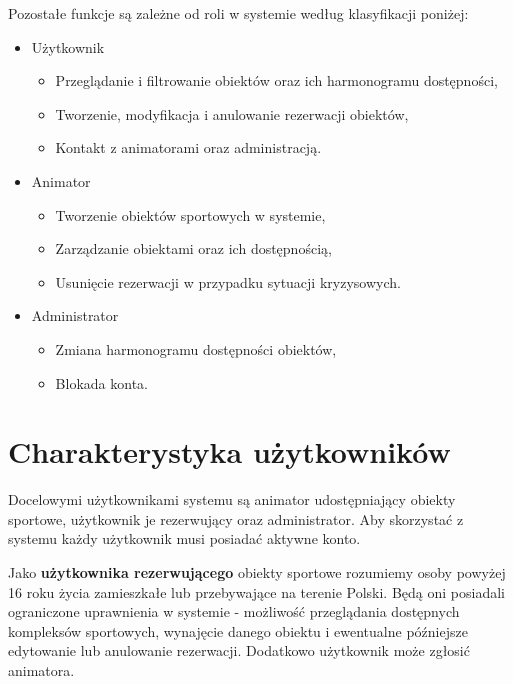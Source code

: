 \documentclass[a4paper,11pt]{article}
\begin{document}
    \par Pozostałe funkcje są zależne od roli w systemie według klasyfikacji poniżej:
    \begin{itemize}
        \item Użytkownik
            \begin{itemize}
                \item Przeglądanie i filtrowanie obiektów oraz ich harmonogramu dostępności,
                \item Tworzenie, modyfikacja i anulowanie rezerwacji obiektów,
                \item Kontakt z animatorami oraz administracją.
            \end{itemize}
        \item Animator
            \begin{itemize}
                \item Tworzenie obiektów sportowych w systemie,
                \item Zarządzanie obiektami oraz ich dostępnością,
                \item Usunięcie rezerwacji w przypadku sytuacji kryzysowych.
            \end{itemize}
        \item Administrator
            \begin{itemize}
                \item Zmiana harmonogramu dostępności obiektów,
                \item Blokada konta.
            \end{itemize}
    \end{itemize}


\section{Charakterystyka użytkowników}

Docelowymi użytkownikami systemu są animator udostępniający obiekty sportowe, użytkownik je rezerwujący oraz administrator. Aby skorzystać z systemu każdy użytkownik musi posiadać aktywne konto.

Jako \textbf{użytkownika rezerwującego} obiekty sportowe rozumiemy osoby powyżej 16 roku życia zamieszkałe lub przebywające na terenie Polski. Będą oni posiadali ograniczone uprawnienia w systemie - możliwość przeglądania dostępnych kompleksów sportowych, wynajęcie danego obiektu i ewentualne późniejsze edytowanie lub anulowanie rezerwacji. Dodatkowo użytkownik może zgłosić animatora. 
\end{document}
